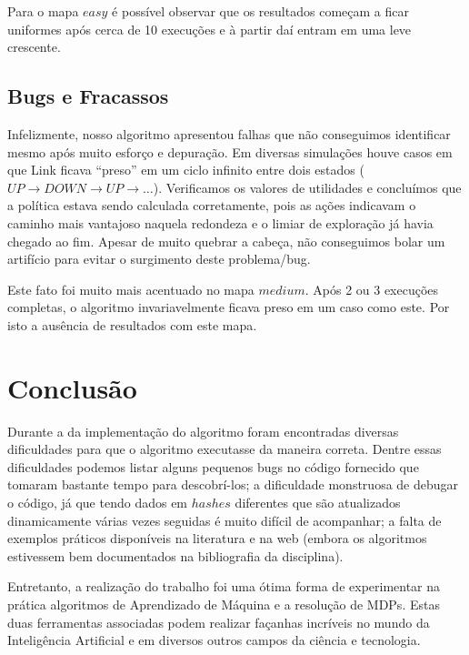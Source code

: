 \documentclass[letterpaper]{article}
\begin{document}
Para o mapa $easy$ é possível observar que os resultados começam a ficar uniformes após cerca de 10 execuções e à partir daí entram em uma leve crescente.

\subsection{Bugs e Fracassos}

Infelizmente, nosso algoritmo apresentou falhas que não conseguimos identificar mesmo após muito esforço e depuração. Em diversas simulações houve casos
em que Link ficava ``preso'' em um ciclo infinito entre dois estados ($UP \rightarrow DOWN \rightarrow UP \rightarrow \ldots$). Verificamos os valores de
utilidades e concluímos que a política estava sendo calculada corretamente, pois as ações indicavam o caminho mais vantajoso naquela redondeza e o limiar
de exploração já havia chegado ao fim. Apesar de muito quebrar a cabeça, não conseguimos bolar um artifício para evitar o surgimento deste problema/bug.

Este fato foi muito mais acentuado no mapa $medium$. Após 2 ou 3 execuções completas, o algoritmo invariavelmente ficava preso em um caso como este. Por
isto a ausência de resultados com este mapa.

\section{Conclusão}

Durante a da implementação do algoritmo foram encontradas diversas dificuldades para que o algoritmo executasse da maneira correta. Dentre essas dificuldades
podemos listar alguns pequenos bugs no código fornecido que tomaram bastante tempo para descobrí-los; a dificuldade monstruosa de debugar o código, já que
tendo dados em $hashes$ diferentes que são atualizados dinamicamente várias vezes seguidas é muito difícil de acompanhar; a falta de exemplos práticos disponíveis
na literatura e na web (embora os algoritmos estivessem bem documentados na bibliografia da disciplina).

Entretanto, a realização do trabalho foi uma ótima forma de experimentar na prática algoritmos de Aprendizado de Máquina e a resolução de MDPs. Estas duas
ferramentas associadas podem realizar façanhas incríveis no mundo da Inteligência Artificial e em diversos outros campos da ciência e tecnologia.
\end{document}

